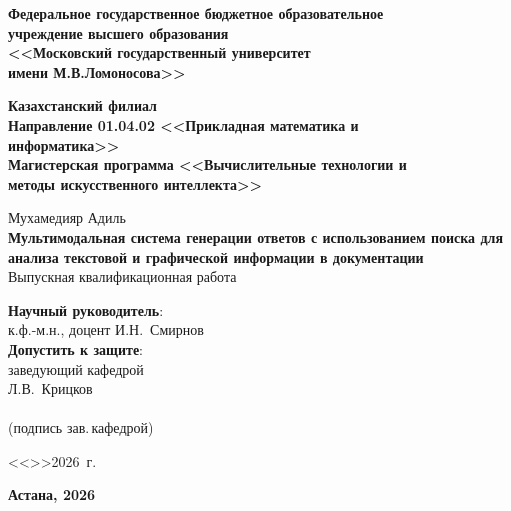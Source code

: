 \documentclass[a4paper,12pt]{article}
\begin{document}
\begin{titlepage}
\begin{center}

\bigskip
\textbf{\large
Федеральное государственное бюджетное образовательное\\
учреждение высшего образования\\
<<Московский государственный университет\\
имени М.В.Ломоносова>>\\[5mm]
}

\textbf{\large
Казахстанский филиал\\
Направление 01.04.02 <<Прикладная математика и\\
информатика>>\\
Магистерская программа <<Вычислительные технологии и\\
методы искусственного интеллекта>>\\[10mm]
}

\bigskip
\bigskip

{\large Мухамедияр Адиль}\\[10mm]
{\LARGE \textbf{Мультимодальная система генерации ответов с использованием поиска для анализа текстовой и графической информации в документации}}\\[10mm]

{\large Выпускная квалификационная работа}

\vfill

\begin{flushright}
\textbf{Научный руководитель}:\\
к.ф.-м.н., доцент И.Н.~Смирнов\\
\textbf{Допустить к защите}:\\
заведующий кафедрой \\
Л.В.~Крицков \\
\underline{\hspace{3.5cm}} \\
(подпись зав.\,кафедрой)

<<\underline{\hspace{1.0cm}}>>\underline{\hspace{3.5cm}}2026~г.
\end{flushright}

\vfill

\textbf{Астана, 2026}
\end{center}
\end{titlepage}

\setcounter{page}{2}
\end{document}

